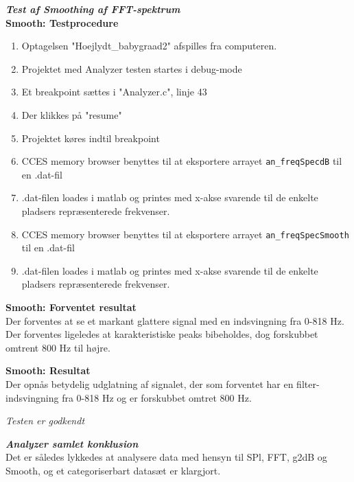\textbf{\textit{Test af Smoothing af FFT-spektrum}}\\
\textbf{Smooth: Testprocedure}
\begin{enumerate}
	\item Optagelsen "Hoejlydt\_babygraad2" afspilles fra computeren.
	\item Projektet med Analyzer testen startes i debug-mode
	\item Et breakpoint sættes i "Analyzer.c", linje 43 
	\item Der klikkes på "resume"
	\item Projektet køres indtil breakpoint
	\item CCES memory browser benyttes til at eksportere arrayet \verb+an_freqSpecdB+ til en .dat-fil 
	\item .dat-filen loades i matlab og printes med x-akse svarende til de enkelte pladsers repræsenterede frekvenser.
	\item CCES memory browser benyttes til at eksportere arrayet \verb+an_freqSpecSmooth+ til en .dat-fil 
	\item .dat-filen loades i matlab og printes med x-akse svarende til de enkelte pladsers repræsenterede frekvenser.
\end{enumerate}

\textbf{Smooth: Forventet resultat} \\
Der forventes at se et markant glattere signal med en indsvingning fra 0-818 Hz. Der forventes ligeledes at karakteristiske peaks bibeholdes, dog forskubbet omtrent 800 Hz til højre.

\textbf{Smooth: Resultat} \\
Der opnås betydelig udglatning af signalet, der som forventet har en filter-indsvingning fra 0-818 Hz og er forskubbet omtret 800 Hz.

\textit{Testen er godkendt}

\textbf{\textit{Analyzer samlet konklusion}}\\
Det er således lykkedes at analysere data med hensyn til SPl, FFT, g2dB og Smooth, og et categoriserbart datasæt er klargjort.